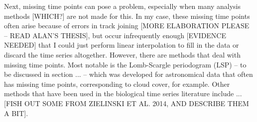 Next, missing time points can pose a problem, especially when many analysis methods [WHICH?] are not made for this.
In my case, these missing time points often arise because of errors in track joining [MORE ELABORATION PLEASE -- READ ALAN'S THESIS], but occur infrequently enough [EVIDENCE NEEDED] that I could just perform linear interpolation to fill in the data or discard the time series altogether.
However, there are methods that deal with missing time points.
Most notable is the Lomb-Scargle periodogram (LSP) -- to be discussed in section ... -- which was developed for astronomical data that often has missing time points, corresponding to cloud cover, for example.
Other methods that have been used in the biological time series literature include ... [FISH OUT SOME FROM ZIELINSKI ET AL. 2014, AND DESCRIBE THEM A BIT].

